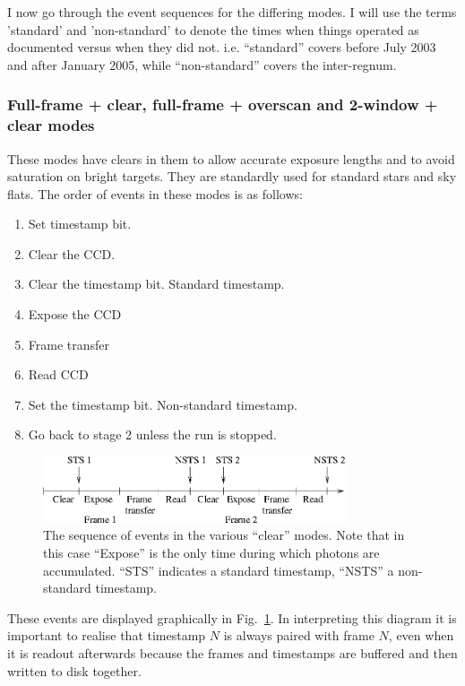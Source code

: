 \documentclass[10pt,a4paper,twocolumn]{article}
\begin{document}
I now go through the event sequences for the differing modes. I will
use the terms 'standard' and 'non-standard' to denote the times when 
things operated as documented versus when they did not. i.e. ``standard'' 
covers before July 2003 and after January 2005, while ``non-standard''
covers the inter-regnum.

\subsubsection{Full-frame + clear, full-frame + overscan and 2-window + clear modes}

These modes have clears in them to allow accurate exposure lengths and
to avoid saturation on bright targets. They are standardly used for
standard stars and sky flats. The order of events in these modes is as follows:
\begin{enumerate}

\item Set timestamp bit. 

\item Clear the CCD.

\item Clear the timestamp bit. Standard timestamp.

\item Expose the CCD

\item Frame transfer

\item Read CCD

\item Set the timestamp bit. Non-standard timestamp.

\item Go back to stage 2 unless the run is stopped.

\end{enumerate}
\begin{figure}
\hspace*{\fill}
\includegraphics[width=0.8\textwidth]{clear_modes}
\hspace*{\fill}

\caption{The sequence of events in the various ``clear'' modes. Note
  that in this case ``Expose'' is the only time during which photons
  are accumulated. ``STS'' indicates a standard timestamp, ``NSTS'' a
  non-standard timestamp.}
\label{fig:clear_modes}
\end{figure}
These events are displayed graphically in
Fig.~\ref{fig:clear_modes}. In interpreting this diagram it is
important to realise that timestamp $N$ is always paired with frame
$N$, even when it is readout afterwards because the frames and
timestamps are buffered and then written to disk together. 
\end{document}
